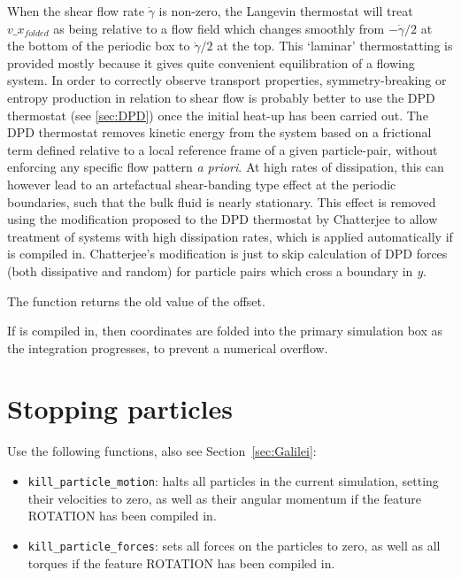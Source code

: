 When the shear flow rate $\dot{\gamma}$ is non-zero, the Langevin thermostat will treat $v\_x_{folded}$ as being relative to a flow field which changes smoothly from $-\dot{\gamma}/2$ at the bottom of the periodic box to $\dot{\gamma}/2$ at the top.  
This `laminar' thermostatting is provided mostly because it gives quite convenient equilibration of a flowing system.  In order to correctly observe transport properties, symmetry-breaking or entropy production in relation to shear flow is probably better to use the DPD thermostat (see \vref{sec:DPD}) once the initial heat-up has been carried out.  
The DPD thermostat removes kinetic energy from the system based on a frictional term defined relative to a local reference frame of a given particle-pair, without enforcing any specific flow pattern \textit{a priori}.  At high rates of dissipation, this can however lead to an artefactual  shear-banding type effect at the periodic boundaries, such that the bulk fluid is nearly stationary.  
This effect is removed using the modification proposed to the DPD thermostat by Chatterjee \cite{chatterjee2007} to allow treatment of systems with high dissipation rates, which is applied automatically if  is compiled in.  Chatterjee's modification is just to skip calculation of DPD forces (both dissipative and random) for particle pairs which cross a boundary in \textit{y}.

The function returns the old value of the offset.

If  is compiled in, then coordinates are folded into the primary simulation box as the integration progresses, to prevent a numerical overflow.  

\section{Stopping particles}

Use the following functions, also see Section~\ref{sec:Galilei}:
\begin{itemize}
\item \texttt{kill\_particle\_motion}: halts all particles in the
  current simulation, setting their velocities to zero, as well as
  their angular momentum if the feature ROTATION has been compiled in.
\item \texttt{kill\_particle\_forces}: sets all forces on the
  particles to zero, as well as all torques if the feature ROTATION
  has been compiled in.
\end{itemize}

